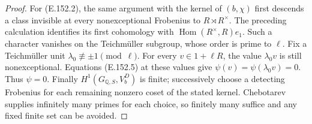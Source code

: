 \begin{proof}
For (E.152.2), the same argument with the kernel of \((b,\chi)\)
first descends a class invisible at every nonexceptional Frobenius
to \(R\rtimes R^\times\). The preceding calculation identifies
its first cohomology with \(\operatorname{Hom}(R^\times,R)e_1\).
Such a character vanishes on the Teichm\"uller subgroup, whose
order is prime to \(\ell\). Fix a Teichm\"uller unit
\(\lambda_0\not\equiv\pm1\pmod\ell\). For every
\(v\in1+\ell R\), the value \(\lambda_0v\) is still
nonexceptional. Equations (E.152.5) at these values give
\(\psi(v)=\psi(\lambda_0v)=0\). Thus \(\psi=0\).
Finally \(H^1(G_{\mathbb Q,S},V_b^D)\) is finite; successively
choose a detecting Frobenius for each remaining nonzero coset of
the stated kernel. Chebotarev supplies infinitely many primes for
each choice, so finitely many suffice and any fixed finite set can
be avoided.
\end{proof}

